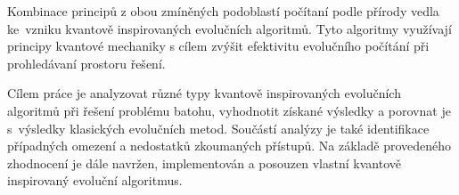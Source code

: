 Kombinace principů z obou zmíněných podoblastí počítaní podle přírody vedla ke~vzniku kvantově inspirovaných evolučních algoritmů. 
Tyto algoritmy využívají principy kvantové mechaniky s cílem zvýšit efektivitu evolučního počítání při prohledávaní prostoru řešení. 

Cílem práce je analyzovat různé typy kvantově inspirovaných evolučních algoritmů při řešení problému batohu, vyhodnotit získané výsledky a porovnat je s~výsledky klasických evolučních metod. 
Součástí analýzy je také identifikace případných omezení a nedostatků zkoumaných přístupů. 
Na základě provedeného zhodnocení je dále navržen, implementován a posouzen vlastní kvantově inspirovaný evoluční algoritmus. 

